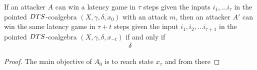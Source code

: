 \begin{proposition}
If an attacker $A$ can win a latency game in $\tau$ steps given the inputs $i_1, \ldots i_{\tau}$ in the pointed $DTS$-coalgebra $(X,\gamma,\delta, x_{0})$ with an attack $m$, then an attacker $A'$ can win the same latency game in $\tau+t$ steps given the input $i_1, i_2, \ldots i_{\tau+1}$ in the pointed $DTS$-coalgebra $(X,\gamma,\delta, x_{-t})$ if and only if 
\begin{align}
\delta
\end{align}

\end{proposition}
\begin{proof}
The main objective of $A_0$ is to reach state $x_{\tau}$ and from there 
\end{proof}



